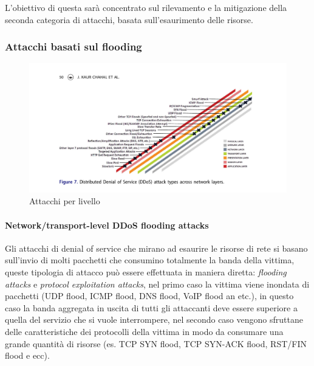 L'obiettivo di questa sarà concentrato sul rilevamento e la mitigazione della seconda categoria di attacchi, basata sull'esaurimento delle risorse.

\subsubsection{Attacchi basati sul flooding}

\begin{figure}[h]
    \includegraphics[width=\hsize]{images/introduzione/attacchi_per_livello.png}
    \caption{Attacchi per livello \cite{ddos_survey_4}}
    \centering
\end{figure}

\paragraph{Network/transport-level DDoS flooding attacks} %
Gli attacchi di denial of service che mirano ad esaurire le risorse di rete si basano sull'invio di molti pacchetti che consumino totalmente la banda della vittima, queste tipologia di attacco può essere effettuata in maniera diretta: \emph{flooding attacks} e \emph{protocol exploitation attacks}, nel primo caso la vittima viene inondata di pacchetti (UDP flood, ICMP flood, DNS flood, VoIP flood an etc.), in questo caso la banda aggregata in uscita di tutti gli attaccanti deve essere superiore a quella del servizio che si vuole interrompere, nel secondo caso vengono sfruttane delle caratteristiche dei protocolli della vittima in modo da consumare una grande quantità di risorse (es. TCP SYN flood, TCP SYN-ACK flood, RST/FIN flood e ecc).

